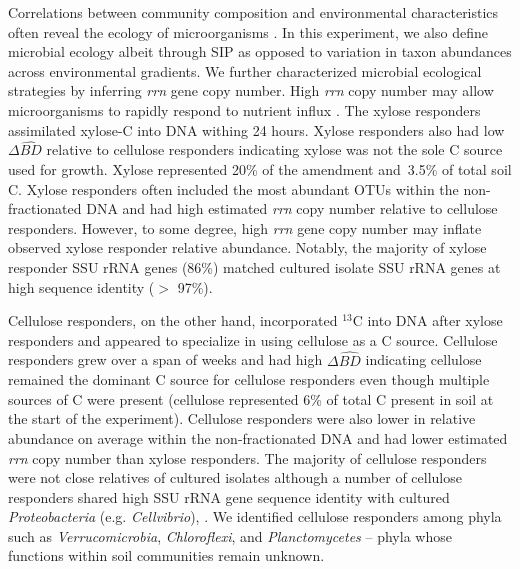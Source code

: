 Correlations between community composition and environmental characteristics
often reveal the ecology of microorganisms \citep{Fierer2007}. In this
experiment, we also define microbial ecology albeit through SIP as opposed to
variation in taxon abundances across environmental gradients. We further
characterized microbial ecological strategies by inferring \textit{rrn} gene
copy number. High \textit{rrn} copy number may allow microorganisms to rapidly
respond to nutrient influx \citep{Klappenbach_2000}. The xylose responders
assimilated xylose-C into DNA withing 24 hours. Xylose responders also had low
$\Delta\hat{BD}$ relative to cellulose responders indicating xylose
was not the sole C source used for growth. Xylose represented 20\% of the
amendment and~3.5\% of total soil C. Xylose responders often included the most
abundant OTUs within the non-fractionated DNA and had high estimated
\textit{rrn} copy number relative to cellulose responders. However, to some
degree, high \textit{rrn} gene copy number may inflate observed xylose
responder relative abundance. Notably, the majority of xylose responder SSU
rRNA genes (86\%) matched cultured isolate SSU rRNA genes at high sequence
identity ($>$ 97\%). 

Cellulose responders, on the other hand, incorporated $^{13}$C into DNA after
xylose responders and appeared to specialize in using cellulose as a C source.
Cellulose responders grew over a span of weeks and had high $\Delta\hat{BD}$
indicating cellulose remained the dominant C source for cellulose responders
even though multiple sources of C were present (cellulose represented 6\% of
total C present in soil at the start of the experiment). Cellulose responders
were also lower in relative abundance on average within the non-fractionated
DNA and had lower estimated \textit{rrn} copy number than xylose responders.
The majority of cellulose responders were not close relatives of cultured
isolates although a number of cellulose responders shared high SSU rRNA gene
sequence identity with cultured \textit{Proteobacteria} (e.g.
\textit{Cellvibrio}), . We identified cellulose responders among phyla such as
\textit{Verrucomicrobia}, \textit{Chloroflexi}, and \textit{Planctomycetes} --
phyla whose functions within soil communities remain unknown.

